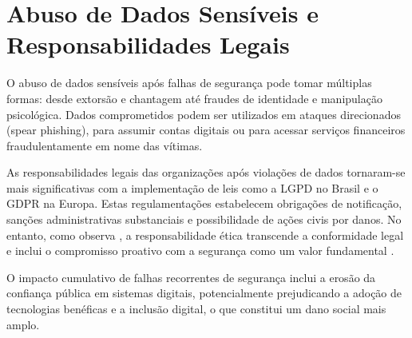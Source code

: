 \section{Abuso de Dados Sensíveis e Responsabilidades Legais}

O abuso de dados sensíveis após falhas de segurança pode tomar múltiplas formas: desde extorsão e chantagem até fraudes de identidade e manipulação psicológica. Dados comprometidos podem ser utilizados em ataques direcionados (spear phishing), para assumir contas digitais ou para acessar serviços financeiros fraudulentamente em nome das vítimas.

As responsabilidades legais das organizações após violações de dados tornaram-se mais significativas com a implementação de leis como a LGPD no Brasil e o GDPR na Europa. Estas regulamentações estabelecem obrigações de notificação, sanções administrativas substanciais e possibilidade de ações civis por danos. No entanto, como observa \citeauthor{hoepers2007csirt}, a responsabilidade ética transcende a conformidade legal e inclui o compromisso proativo com a segurança como um valor fundamental \cite{hoepers2007csirt}.

O impacto cumulativo de falhas recorrentes de segurança inclui a erosão da confiança pública em sistemas digitais, potencialmente prejudicando a adoção de tecnologias benéficas e a inclusão digital, o que constitui um dano social mais amplo. 